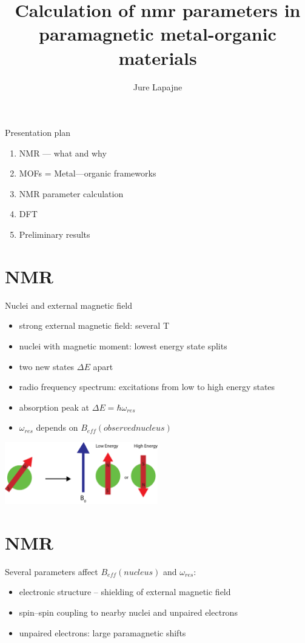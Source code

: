 \documentclass[slovene, usenames,dvipsnames]{beamer}
\author{Jure Lapajne}
\title{Calculation of nmr parameters in paramagnetic metal-organic materials}
\begin{document}
\maketitle

\begin{frame}{Presentation plan}
  \begin{enumerate}
  \item NMR --- what and why \pause
  \item MOFs = Metal---organic frameworks \pause
  \item NMR parameter calculation \pause
  \item DFT \pause
  \item Preliminary results \pause
  \end{enumerate}
\end{frame}

\section{NMR}
\begin{frame}{Nuclei and external magnetic field}
  \begin{itemize}
  \item strong external magnetic field: several T
  \item nuclei with magnetic moment: lowest energy state splits
    \item two new states $\Delta E$ apart
  \item radio frequency spectrum: excitations from low to high energy states
  \item absorption peak at $\Delta E=\hbar \omega_{res}$
    \item $\omega_{res}$ depends on $B_{eff}(observed nucleus)$
    \end{itemize}
    \begin{minipage}[]{\textwidth}
      \centering
    \includegraphics[width=0.5\textwidth]{spin_energy_states.png}
\end{minipage}
\end{frame}

\section{NMR}
\begin{frame}{}
  Several parameters affect $B_{eff}(nucleus)$ and $\omega_{res}$:
  \begin{itemize}
  \item electronic structure -- shielding of external magnetic field 
  \item spin--spin coupling to nearby nuclei and unpaired electrons
   \item unpaired electrons: large paramagnetic shifts
    \end{itemize}
\end{frame}
\end{document}
